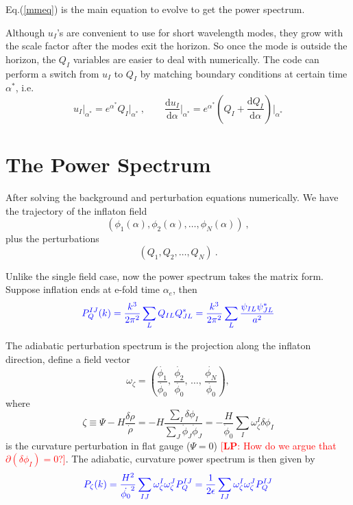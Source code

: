 \documentclass[11pt]{article}
\newcommand{\ud}{\mathrm{d}}
\newcommand{\lp}[1]{\textcolor{red}{[{\bf LP}: #1]}}
\begin{document}
{\color{blue} Eq.(\ref{mmeq}) is the main equation to evolve to get the power spectrum. }

Although $u_I$'s are convenient to use for short wavelength modes, they grow with the scale factor after the modes exit the horizon. So once the mode is outside the horizon, the $Q_I$ variables are easier to deal with numerically. The code can perform a switch from $u_I$ to $Q_I$ by matching boundary conditions at certain time $\alpha^*$, i.e.
\begin{equation}
u_I\Big|_{\alpha^*} = e^{\alpha^*} Q_I \Big|_{\alpha^*} ~, \quad \quad 
\frac{\ud u_I}{\ud \alpha}\Big|_{\alpha^*} = e^{\alpha^*} \left(Q_I + \frac{\ud Q_I}{\ud \alpha}\right)\Big|_{\alpha^*}
\end{equation}


\section{The Power Spectrum}

After solving the background and perturbation equations numerically. We have the trajectory of the inflaton field 
\[
(\phi_1(\alpha), \phi_2(\alpha), \dots, \phi_N(\alpha) ) ~,
\]
plus the perturbations
\[
(Q_1, Q_2, \dots, Q_N) ~. 
\]

Unlike the single field case, now the power spectrum takes the matrix form. Suppose inflation ends at e-fold time $\alpha_e$, then
\begin{equation}
{\color{blue}
P_Q^{IJ} (k) = \frac{k^3}{2\pi^2} \sum_L Q_{IL}Q^*_{JL} =
\frac{k^3}{2\pi^2} \sum_L \frac{\psi_{IL}\psi^*_{JL}}{a^2}
}
\end{equation}

The adiabatic perturbation spectrum is the projection along the inflaton direction, define a field vector
\begin{equation}
\omega_\zeta = \left( \frac{\dot{\phi_1}}{\dot{\phi_0}},\, \frac{\dot{\phi_2}}{\dot{\phi_0}},\, \dots,\, \frac{\dot{\phi_N}}{\dot{\phi_0}} \right),
\end{equation}
where
\begin{equation}
  \zeta \equiv \Psi - H \frac{\delta \rho}{\dot \rho} = -H \frac{ \sum_I \delta \phi_I}{\sum_J \dot \phi_J \dot \phi_J} = -\frac{H}{\dot \phi_0}\sum_I \omega_\zeta^I \delta \phi_I
  \label{eqn:XXX}
\end{equation}
is the curvature perturbation in flat gauge ($\Psi=0$) \lp{How do we argue that $\partial(\delta \phi_I)=0$?}.  The adiabatic, curvature power spectrum is then given by
\begin{equation}
{\color{blue}
  P_\zeta(k) = \frac{H^2}{\dot{\phi_0}^2} \sum_{IJ} \omega_\zeta^I \omega_\zeta^J P_Q^{IJ} = \frac{1}{2 \epsilon} \sum_{IJ} \omega_\zeta^I \omega_\zeta^J P_Q^{IJ}
}
\end{equation}
\end{document}
